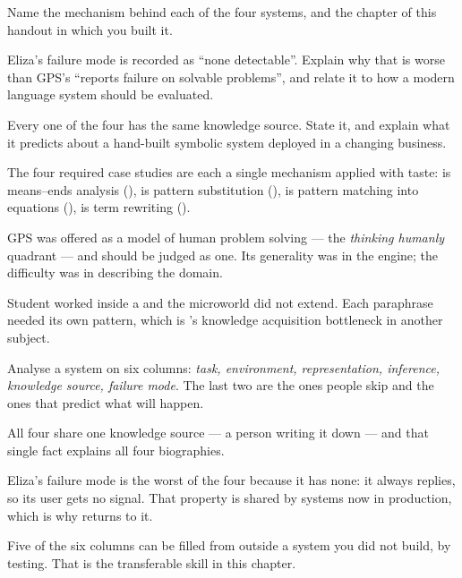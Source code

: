 \begin{checkpoint}
\begin{tightnum}
  \item Name the mechanism behind each of the four systems, and the chapter of this
        handout in which you built it.
  \item Eliza's failure mode is recorded as ``none detectable''. Explain why that is
        worse than GPS's ``reports failure on solvable problems'', and relate it to
        how a modern language system should be evaluated.
  \item Every one of the four has the same knowledge source. State it, and explain
        what it predicts about a hand-built symbolic system deployed in a changing
        business.
\end{tightnum}
\end{checkpoint}

\begin{chaptersummary}
\begin{tight}
  \item The four required case studies are each a single mechanism applied with
        taste:  is means--ends analysis (), 
        is pattern substitution (),  is pattern matching
        into equations (),  is term rewriting
        ().
  \item GPS was offered as a model of human problem solving --- the \emph{thinking
        humanly} quadrant --- and should be judged as one. Its generality was in
        the engine; the difficulty was in describing the domain.
  \item Student worked inside a  and the microworld did not extend.
        Each paraphrase needed its own pattern, which is 's knowledge
        acquisition bottleneck in another subject.
  \item Analyse a system on six columns: \emph{task, environment, representation,
        inference, knowledge source, failure mode}. The last two are the ones people
        skip and the ones that predict what will happen.
  \item All four share one knowledge source --- a person writing it down --- and
        that single fact explains all four biographies.
  \item Eliza's failure mode is the worst of the four because it has none: it always
        replies, so its user gets no signal. That property is shared by systems now
        in production, which is why  returns to it.
  \item Five of the six columns can be filled from outside a system you did not
        build, by testing. That is the transferable skill in this chapter.
\end{tight}
\end{chaptersummary}

